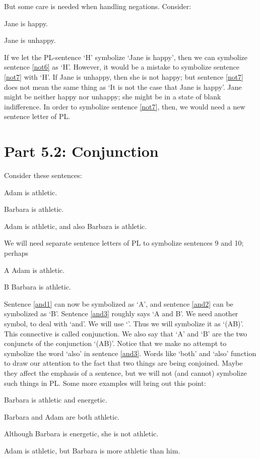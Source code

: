 But some care is needed when handling negations. Consider:
	\begin{earg}
		\item[\ex{not6}] Jane is happy.
		\item[\ex{not7}] Jane is unhappy.
	\end{earg}
If we let the PL-sentence ‘H’ symbolize ‘Jane is happy’, then we can symbolize sentence \ref{not6} as ‘H’. However, it would be a mistake to symbolize sentence \ref{not7} with ‘\enot H’. If Jane is unhappy, then she is not happy; but sentence  \ref{not7} does not mean the same thing as ‘It is not the case that Jane is happy’. Jane might be neither happy nor unhappy; she might be in a state of blank indifference. In order to symbolize sentence  \ref{not7}, then, we would need a new sentence letter of PL.
\section{Part 5.2: Conjunction}
\label{s:Part 5.2: Conjunction}
Consider these sentences:
	\begin{earg}
		\item[\ex{and1}]Adam is athletic.
		\item[\ex{and2}]Barbara is athletic.
		\item[\ex{and3}]Adam is athletic, and also Barbara is athletic.
	\end{earg}
We will need separate sentence letters of PL to symbolize sentences 9 and 10; perhaps
	\begin{ekey}
		\item[A] Adam is athletic.
		\item[B] Barbara is athletic.
	\end{ekey}
Sentence \ref{and1} can now be symbolized as ‘A’, and sentence \ref{and2} can be symbolized as ‘B’. Sentence \ref{and3} roughly says ‘A and B’. We need another symbol, to deal with ‘and’. We will use ‘\eand’. Thus we will symbolize it as ‘(A\eand B)’. This connective is called \gls{conjunction}. We also say that ‘A’ and ‘B’ are the two \glspl{conjunct} of the conjunction ‘(A\eand B)’.
Notice that we make no attempt to symbolize the word ‘also’ in sentence  \ref{and3}. Words like ‘both’ and ‘also’ function to draw our attention to the fact that two things are being conjoined. Maybe they affect the emphasis of a sentence, but we will not (and cannot) symbolize such things in PL.
Some more examples will bring out this point:
	\begin{earg}
		\item[\ex{and4}]Barbara is athletic and energetic.
		\item[\ex{and5}]Barbara and Adam are both athletic.
		\item[\ex{and6}]Although Barbara is energetic, she is not athletic.
		\item[\ex{and7}]Adam is athletic, but Barbara is more athletic than him.
	\end{earg}
